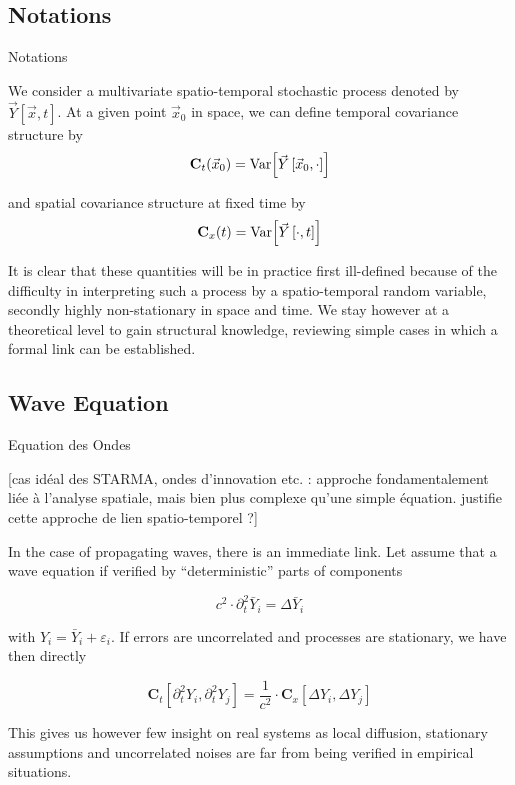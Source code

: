 \subsection{Notations}{Notations}

We consider a multivariate spatio-temporal stochastic process denoted by $\vec{Y}\left[\vec{x},t\right]$. At a given point $\vec{x}_0$ in space, we can define temporal covariance structure by
\[
\mathbf{C}_t (\vec{x}_0) = \operatorname{Var}\!\left[\vec{Y}\left[\vec{x}_0, \cdot\right]\right]
\]

and spatial covariance structure at fixed time by
\[
\mathbf{C}_x (t) = \operatorname{Var}\!\left[\vec{Y}\left[\cdot, t\right]\right]
\]

It is clear that these quantities will be in practice first ill-defined because of the difficulty in interpreting such a process by a spatio-temporal random variable, secondly highly non-stationary in space and time. We stay however at a theoretical level to gain structural knowledge,
 reviewing simple cases in which a formal link can be established.


\subsection{Wave Equation}{Equation des Ondes}

[cas idéal des STARMA, ondes d'innovation etc. : approche fondamentalement liée à l'analyse spatiale, mais bien plus complexe qu'une simple équation. justifie cette approche de lien spatio-temporel ?]

In the case of propagating waves, there is an immediate link. Let assume that a wave equation if verified by ``deterministic'' parts of components

\begin{equation}
c^2 \cdot \partial^2_{t} \bar{Y}_i = \Delta \bar{Y}_i
\end{equation}

with $Y_i = \bar{Y}_i + \varepsilon_i$. If errors are uncorrelated and processes are stationary, we have then directly

\begin{equation}
\mathbf{C}_t \left[ \partial^2_t Y_i , \partial^2_t Y_j \right] = \frac{1}{c^2} \cdot\mathbf{C}_x \left[ \Delta Y_i , \Delta Y_j \right]
\end{equation}

This gives us however few insight on real systems as local diffusion, stationary assumptions and uncorrelated noises are far from being verified in empirical situations.

